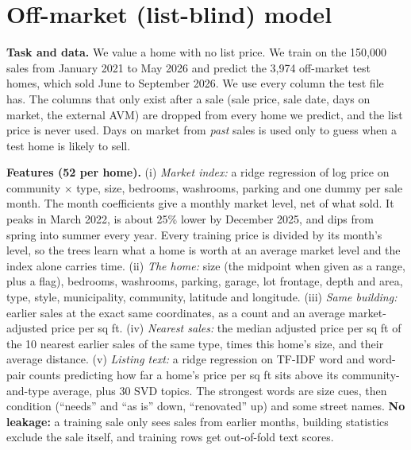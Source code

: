 
\section{Off-market (list-blind) model}

\textbf{Task and data.} We value a home with no list price. We train on the 150,000 sales from January 2021
to May 2026 and predict the 3,974 off-market test homes, which sold June to September 2026. We use every
column the test file has. The columns that only exist after a sale (sale price, sale date, days on market,
the external AVM) are dropped from every home we predict, and the list price is never used. Days on
market from \emph{past} sales is used only to guess when a test home is likely to sell.

\textbf{Features (52 per home).}
(i) \emph{Market index:} a ridge regression of log price on community $\times$ type, size, bedrooms,
washrooms, parking and one dummy per sale month. The month coefficients give a monthly market level, net of
what sold. It peaks in March 2022, is about 25\% lower by December 2025, and dips from spring into summer
every year. Every training price is divided by its month's level, so the trees learn what a home is worth
at an average market level and the index alone carries time.
(ii) \emph{The home:} size (the midpoint when given as a range, plus a flag), bedrooms, washrooms,
parking, garage, lot frontage, depth and area, type, style, municipality, community, latitude and longitude.
(iii) \emph{Same building:} earlier sales at the exact same coordinates, as a count and an average
market-adjusted price per sq ft.
(iv) \emph{Nearest sales:} the median adjusted price per sq ft of the 10 nearest earlier sales of the
same type, times this home's size, and their average distance.
(v) \emph{Listing text:} a ridge regression on TF-IDF word and word-pair counts predicting how far a
home's price per sq ft sits above its community-and-type average, plus 30 SVD topics. The strongest words
are size cues, then condition (``needs'' and ``as is'' down, ``renovated'' up) and some street names.
\textbf{No leakage:} a training sale only sees sales from earlier months, building statistics exclude
the sale itself, and training rows get out-of-fold text scores.

